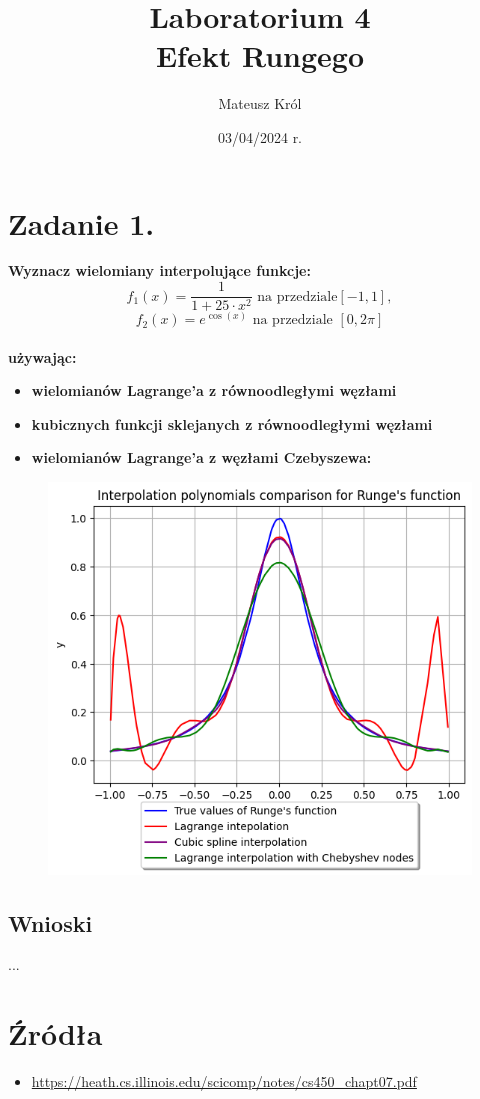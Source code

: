\documentclass{article}
\title{%
Laboratorium 4\\
  \huge Efekt Rungego}
\author{Mateusz Król}
\date{03/04/2024 r.}
\begin{document}
\maketitle


\section*{Zadanie 1.}
\textbf{Wyznacz wielomiany interpolujące funkcje:}
$$f_1(x) = \frac{1}{1 + 25\cdot x^2} \mbox{ na przedziale} [-1, 1], $$
$$f_2(x) = e^{\cos(x)} \mbox{ na przedziale } [0, 2\pi]$$
\\
\textbf{używając:} 
\begin{itemize}
  \item \textbf{wielomianów Lagrange’a z równoodległymi węzłami}
  \item \textbf{kubicznych funkcji sklejanych z równoodległymi węzłami} 
  \item \textbf{wielomianów Lagrange’a z węzłami Czebyszewa:}
\end{itemize}

\begin{figure}[H]
  \includegraphics[width=\linewidth]{figures/interpolation.png}
\end{figure}



\subsection*{Wnioski}
\null\quad ...

\section*{Źródła}
\begin{itemize}
    \item \url{https://heath.cs.illinois.edu/scicomp/notes/cs450_chapt07.pdf}
\end{itemize}
\end{document}
